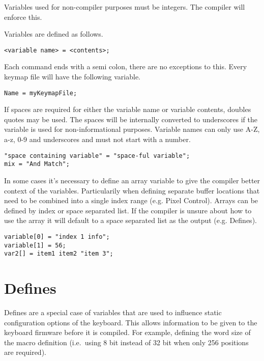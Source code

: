 \documentclass{kiibohd-template}
\begin{document}
Variables used for non-compiler purposes must be integers.
The compiler will enforce this.

Variables are defined as follows.

\begin{lstlisting}
<variable name> = <contents>;
\end{lstlisting}

Each command ends with a semi colon, there are no exceptions to this.
Every keymap file will have the following variable.

\begin{lstlisting}
Name = myKeymapFile;
\end{lstlisting}

If spaces are required for either the variable name or variable contents, doubles quotes may be used.
The spaces will be internally converted to underscores if the variable is used for non-informational purposes.
Variable names can only use A-Z, a-z, 0-9 and underscores and must not start with a number.

\begin{lstlisting}
"space containing variable" = "space-ful variable";
mix = "And Match";
\end{lstlisting}

In some cases it's necessary to define an array variable to give the compiler better context of the variables.
Particularily when defining separate buffer locations that need to be combined into a single index range (e.g. Pixel Control).
Arrays can be defined by index or space separated list.
If the compiler is unsure about how to use the array it will default to a space separated list as the output (e.g. Defines).

\begin{lstlisting}
variable[0] = "index 1 info";
variable[1] = 56;
var2[] = item1 item2 "item 3";
\end{lstlisting}


\section{Defines}
\label{sec:Defines}

Defines are a special case of variables that are used to influence static configuration options of the keyboard.
This allows information to be given to the keyboard firmware before it is compiled.
For example, defining the word size of the macro definition (i.e.\ using 8 bit instead of 32 bit when only 256 positions are required).
\end{document}
